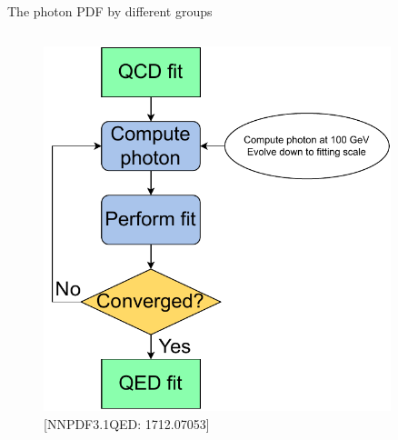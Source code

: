 \documentclass[aspectratio=169, 8pt,t]{beamer}
\begin{document}
\begin{frame}{The photon PDF by different groups}
\begin{columns}
    \begin{column}{0.39\textwidth}
      \vspace*{-1.5em}
      \begin{figure}
        \includegraphics[width=0.9\textwidth]{figures/luxqed_iteration.pdf}
        \caption*{\color{gray}\small [NNPDF3.1QED: 1712.07053]}
      \end{figure}
    \end{column}
  \end{columns}

\end{frame}
\end{document}
